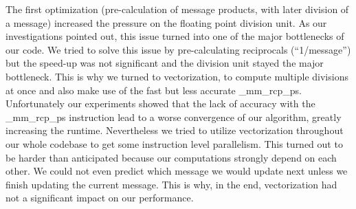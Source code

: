 The first optimization (pre-calculation of message products, with later division of a message) increased the pressure on the floating point division unit. As our investigations pointed out, this issue turned into one of the major bottlenecks of our code. We tried to solve this issue by pre-calculating reciprocals (“1/message”) but the speed-up was not significant and the division unit stayed the major bottleneck. This is why we turned to vectorization, to compute multiple divisions at once and also make use of the fast but less accurate \_mm\_rcp\_ps. Unfortunately our experiments showed that the lack of accuracy with the \_mm\_rcp\_ps instruction lead to a worse convergence of our algorithm, greatly increasing the runtime. Nevertheless we tried to utilize vectorization throughout our whole codebase to get some instruction level parallelism. This turned out to be harder than anticipated because our computations strongly depend on each other. We could not even predict which message we would update next unless we finish updating the current message. This is why, in the end, vectorization had not a significant impact on our performance.



